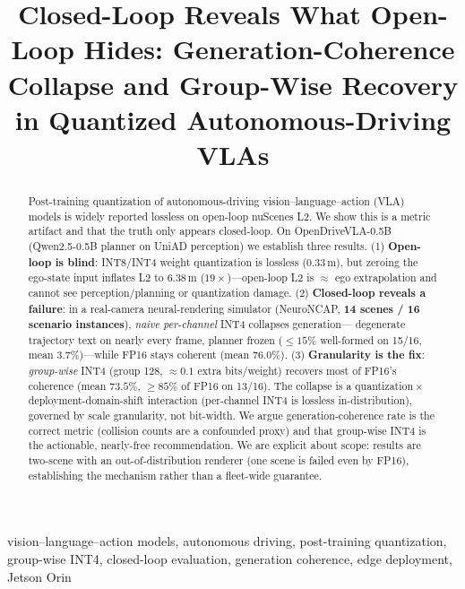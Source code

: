 \documentclass[conference]{IEEEtran}
\title{\textbf{Closed-Loop Reveals What Open-Loop Hides: Generation-Coherence\\
Collapse and Group-Wise Recovery in Quantized Autonomous-Driving VLAs}}
\author{\IEEEauthorblockN{Justin Williams, Kishor Datta Gupta, Roy George, Mrinmoy Sarkar}
\IEEEauthorblockA{Clark Atlanta University \\ \texttt{justinwilliamstech693@gmail.com}}}
\begin{document}
\maketitle

\begin{abstract}
Post-training quantization of autonomous-driving vision--language--action (VLA) models is widely
reported lossless on open-loop nuScenes L2. We show this is a metric artifact and that the truth
only appears closed-loop. On OpenDriveVLA-0.5B (Qwen2.5-0.5B planner on UniAD perception) we
establish three results. (1) \textbf{Open-loop is blind}: INT8/INT4 weight quantization is lossless
($0.33$\,m), but zeroing the ego-state input inflates L2 to $6.38$\,m ($19\times$)---open-loop L2 is
$\approx$ ego extrapolation and cannot see perception/planning or quantization damage. (2)
\textbf{Closed-loop reveals a failure}: in a real-camera neural-rendering simulator (NeuroNCAP,
\textbf{14 scenes / 16 scenario instances}), \emph{naive per-channel} INT4 collapses generation---
degenerate trajectory text on nearly every frame, planner frozen ($\le 15\%$ well-formed on 15/16,
mean $3.7\%$)---while FP16 stays coherent (mean $76.0\%$). (3) \textbf{Granularity is the fix}:
\emph{group-wise} INT4 (group 128, $\approx 0.1$ extra bits/weight) recovers most of FP16's coherence
(mean $73.5\%$, $\ge 85\%$ of FP16 on 13/16). The
collapse is a quantization\,$\times$\,deployment-domain-shift interaction (per-channel INT4 is
lossless in-distribution), governed by scale granularity, not bit-width. We argue
generation-coherence rate is the correct metric (collision counts are a confounded proxy) and that
group-wise INT4 is the actionable, nearly-free recommendation. We are explicit about scope: results
are two-scene with an out-of-distribution renderer (one scene is failed even by FP16), establishing
the mechanism rather than a fleet-wide guarantee.
\end{abstract}
\begin{IEEEkeywords}
vision--language--action models, autonomous driving, post-training quantization, group-wise INT4, closed-loop evaluation, generation coherence, edge deployment, Jetson Orin
\end{IEEEkeywords}
\end{document}
